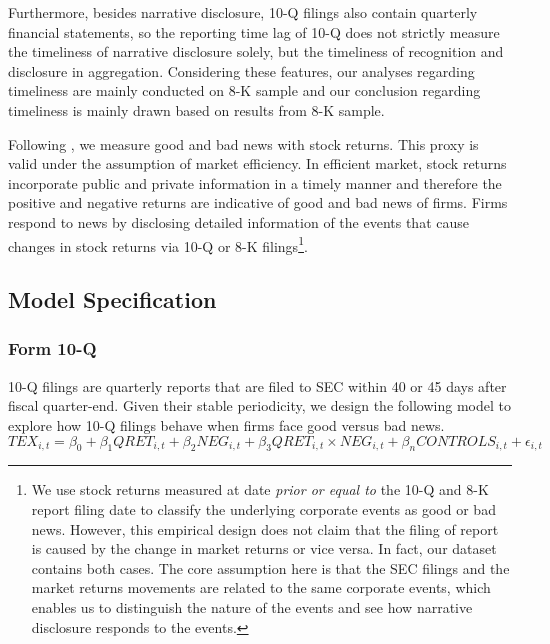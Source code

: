 \documentclass[a4paper]{article}
\begin{document}
\begin{spacing}{2}
Furthermore, besides narrative disclosure, 10-Q filings also contain quarterly financial statements, so the reporting time lag of 10-Q does not strictly measure the timeliness of narrative disclosure solely, but the timeliness of recognition and disclosure in aggregation. Considering these features, our analyses regarding timeliness are mainly conducted on 8-K sample and our conclusion regarding timeliness is mainly drawn based on results from 8-K sample.

Following \citet{basuConservatismPrincipleAsymmetric1997}, we measure good and bad news with stock returns. This proxy is valid under the assumption of market efficiency. In efficient market, stock returns incorporate public and private information in a timely manner and therefore the positive and negative returns are indicative of good and bad news of firms. %
Firms respond to news by disclosing detailed information of the events that cause changes in stock returns via 10-Q or 8-K filings\footnote{We use stock returns measured at date \textit{prior or equal to} the 10-Q and 8-K report filing date to classify the underlying corporate events as good or bad news. 
However, this empirical design does not claim that the filing of report is caused by the change in market returns or vice versa. In fact, our dataset contains both cases. The core assumption here is that the SEC filings and the market returns movements are related to the same corporate events, which enables us to distinguish the nature of the events and see how narrative disclosure responds to the events.}.

\subsection{Model Specification}
\subsubsection{Form 10-Q}
10-Q filings are quarterly reports that are filed to SEC within 40 or 45 days after fiscal quarter-end. Given their stable periodicity, we design the following model to explore how 10-Q filings behave when firms face good versus bad news. 
\begin{equation} \label{eq1}
TEX_{i,t}=\beta_0+\beta_1QRET_{i,t}+\beta_2NEG_{i,t}+\beta_3QRET_{i,t}\times NEG_{i,t}+\beta_nCONTROLS_{i,t}+\epsilon_{i,t}
\end{equation}


\end{spacing}
\end{document}
